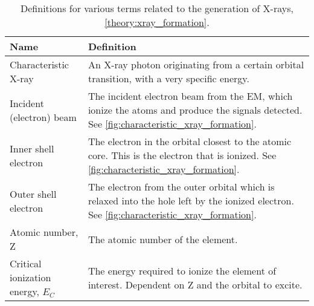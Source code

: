 \begin{table}[phb]
    \begin{center}
        \caption{
            Definitions for various terms related to the generation of X-rays, \cref{theory:xray_formation}.
        }
        \renewcommand*{\arraystretch}{1.4}
        \label{tab:xray_generation}
        \begin{tabular}{p{3cm}p{11.6cm}}
            \hline
            \textbf{Name}                        & \textbf{Definition}                                                                                                                                                                                         \\
            \hline
            Characteristic X-ray                 & An X-ray photon originating from a certain orbital transition, with a very specific energy.                                                                                                                 \\
            Incident (electron) beam             & The incident electron beam from the EM, which ionize the atoms and produce the signals detected. See  \cref{fig:characteristic_xray_formation}.                                                             \\
            Inner shell electron                 & The electron in the orbital closest to the atomic core. This is the electron that is ionized. See  \cref{fig:characteristic_xray_formation}.                                                                \\
            Outer shell electron                 & The electron from the outer orbital which is relaxed into the hole left by the ionized electron. See  \cref{fig:characteristic_xray_formation}.                                                             \\
            Atomic number, Z                     & The atomic number of the element.                                                                                                                                                                           \\
            Critical ionization energy, $E_C$    & The energy required to ionize the element of interest. Dependent on Z and the orbital to excite.                                                                                                            \\

\end{tabular}
\end{center}
\end{table}
